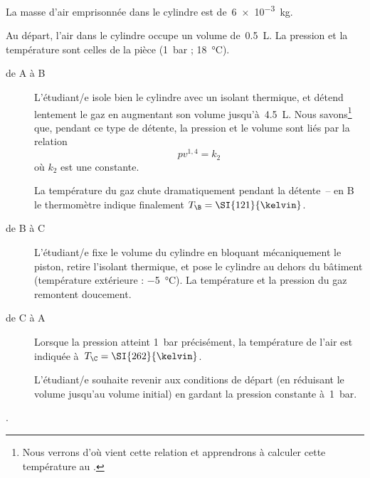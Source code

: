 	La masse d’air emprisonnée dans le cylindre est de~\SI{6e-3}{\kilogram}.
	
	Au départ, l’air dans le cylindre occupe un volume de~\SI{0,5}{\liter}. La pression et la température sont celles de la pièce (\SI{1}{bar} ; \SI{18}{\degreeCelsius}).

	\begin{description}
		\item[de A à B] L’étudiant/e isole bien le cylindre avec un isolant thermique, et détend lentement le gaz en augmentant son volume jusqu’à~\SI{4,5}{\liter}. Nous savons\footnote{Nous verrons d’où vient cette relation et apprendrons à calculer cette température au \coursquatre.} que, pendant ce type de détente, la pression et le volume sont liés par la relation 
			\begin{equation*}
				p v^{1,4} = k_2
			\end{equation*}
			 où $k_2$ est une constante. 
		
			La température du gaz chute dramatiquement pendant la détente\ – en B le thermomètre indique finalement $T_\B = \SI{121}{\kelvin}$. 
		
		\item[de B à C]	L’étudiant/e fixe le volume du cylindre en bloquant mécaniquement le piston, retire l’isolant thermique, et pose le cylindre au dehors du bâtiment (température extérieure : \SI{-5}{\degreeCelsius}). La température et la pression du gaz remontent doucement.

		\item[de C à A] Lorsque la pression atteint \SI{1}{\bar} précisément, la température de l’air est indiquée à~$T_\C = \SI{262}{\kelvin}$. 	
					
			L’étudiant/e souhaite revenir aux conditions de départ (en réduisant le volume jusqu’au volume initial) en gardant la pression constante à~\SI{1}{\bar}.
	\end{description}.
	

